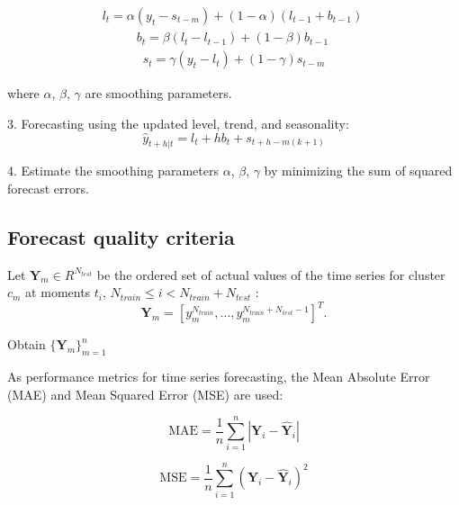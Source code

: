 \begin{align}
l_t = \alpha(y_t - s_{t-m}) + (1-\alpha)(l_{t-1} + b_{t-1})\
\end{align}
\begin{align}
b_t = \beta(l_t - l_{t-1}) + (1-\beta)b_{t-1}\
\end{align}
\begin{align}
s_t = \gamma(y_t - l_t) + (1-\gamma)s_{t-m}
\end{align}

where $\alpha$, $\beta$, $\gamma$ are smoothing parameters.

3. Forecasting using the updated level, trend, and seasonality:
\begin{equation}
\hat{y}_{t+h|t} = l_t + hb_t + s_{t+h-m(k+1)}
\end{equation}

4. Estimate the smoothing parameters $\alpha$, $\beta$, $\gamma$ by minimizing the sum of squared forecast errors.


\subsection{Forecast quality criteria}

Let $\mathbf{Y}_m \in R^{N_{test}}$ be the ordered set of actual values of the time series for cluster $c_m$ at moments $t_i$, 
$N_{train} \leq i < N_{train} + N_{test}$ :
\begin{equation}
     \mathbf{Y}_m = [y_m^{N_{train}}, \ldots, y_m^{N_{train} + N_{test} - 1}]^T.
\end{equation}

Obtain 
$\{\mathbf{Y}_m\}_{m=1}^{n}$

 

As performance metrics for time series forecasting, the Mean Absolute Error (MAE) and Mean Squared Error (MSE) are used:

\begin{equation}
\text{MAE} = \frac{1}{n}\sum\limits_{i = 1}^{n}|\mathbf{Y}_i - \mathbf{\hat{Y}}_i|
\end{equation}

\begin{equation}
\text{MSE} = \frac{1}{n}\sum\limits_{i = 1}^{n}(\mathbf{Y}_i - \mathbf{\hat{Y}}_i)^2
\end{equation}

